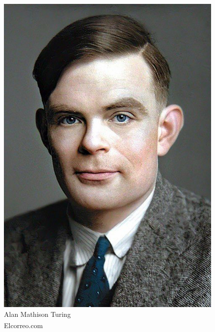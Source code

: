 \begin{frame}[t]
{\begin{minipage}[t]{\textwidth}
\begin{minipage}[t]{0.4\textwidth}
\begin{figure}[ht]
				    \includegraphics[width=.6\textwidth]{img/alan-turing-color.png}
				    {\tiny\\Alan Mathison Turing\\\textsuperscript{\textcopyright}Elcorreo.com}
			    \end{figure}
		    \end{minipage}
	    \end{minipage}
    }
\end{frame}
%
